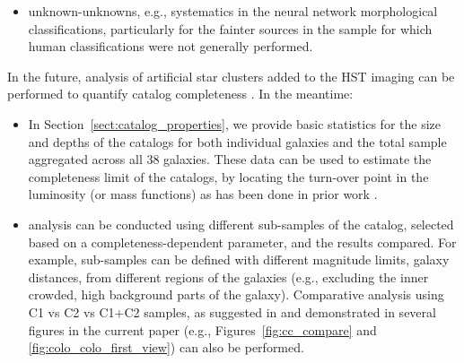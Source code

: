 \documentclass[linenumbers]{aastex63}
\begin{document}
\begin{itemize}
\begin{itemize}
    \item Even when pipelines are specifically developed for single-peaked clusters, differences in the adopted detection algorithm and morphological selection criteria \citep[which has generally been based on some form of concentration index, e.g.,][]{chandar_luminosity_2010, adamo_legacy_2017} can lead to significant differences in the populations captured.  As discussed in \citet{thilker_phangs-hst_2022}, LEGUS \citep{calzetti_legacy_2015} has produced cluster catalogs for four of the seven galaxies in common with PHANGS (NGC~628, NGC~1433, NGC~1566, NGC~3351)\footnote{\url{https://archive.stsci.edu/prepds/legus/dataproducts-public.html}}, and there is an overlap of 50–75\% of human verified C1 and C2 clusters in the union of the LEGUS$+$PHANGS-HST catalogs.  Understanding the differences in the catalogs, and comparison of results based on the union of the two catalogs with those based on the separate catalogs from each survey will be important subjects for future investigation.
    \end{itemize}
    \item unknown-unknowns, e.g., systematics in the neural network morphological classifications, particularly for the fainter sources in the sample for which human classifications were not generally performed. 
    
\end{itemize}

In the future, analysis of artificial star clusters added to the HST imaging can be performed to quantify catalog completeness \citep[e.g.,][]{adamo_legacy_2017, tang_cluster_2023}.  In the meantime:
\begin{itemize}
\item In Section~\ref{sect:catalog_properties}, we provide basic statistics for the size and depths of the catalogs for both individual galaxies and the total sample aggregated across all 38 galaxies.  These data can be used to estimate the completeness limit of the catalogs, by locating the turn-over point in the luminosity (or mass functions) as has been done in prior work \citep[e.g.,][]{mayya_hst_2008, ryon_effective_2017, cook_star_2019, cuevas-otahola_cluster_2023}.
\item analysis can be conducted using different sub-samples of the catalog, selected based on a completeness-dependent parameter, and the results compared.  For example, sub-samples can be defined with different magnitude limits, galaxy distances, from different regions of the galaxies (e.g., excluding the inner crowded, high background parts of the galaxy).  Comparative analysis using C1 vs C2 vs C1+C2 samples, as suggested in \citet{whitmore_star_2021} and demonstrated in several figures in the current paper (e.g., Figures~\ref{fig:cc_compare} and \ref{fig:colo_colo_first_view}) can also be performed.
\end{itemize}
\end{document}
